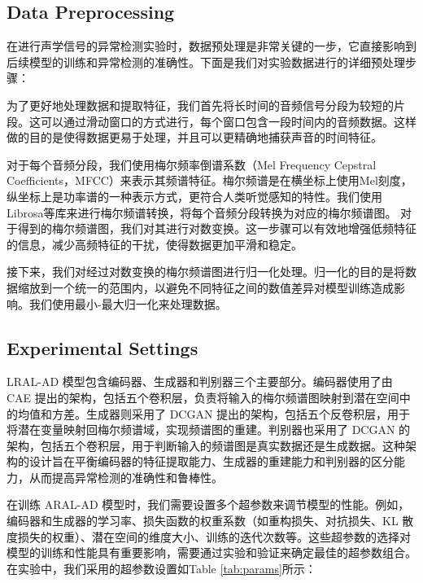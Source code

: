 \documentclass{article}
\begin{document}
\subsection{Data Preprocessing}

在进行声学信号的异常检测实验时，数据预处理是非常关键的一步，它直接影响到后续模型的训练和异常检测的准确性。下面是我们对实验数据进行的详细预处理步骤：


为了更好地处理数据和提取特征，我们首先将长时间的音频信号分段为较短的片段。这可以通过滑动窗口的方式进行，每个窗口包含一段时间内的音频数据。这样做的目的是使得数据更易于处理，并且可以更精确地捕获声音的时间特征。


对于每个音频分段，我们使用梅尔频率倒谱系数（Mel Frequency Cepstral Coefficients，MFCC）来表示其频谱特征。梅尔频谱是在横坐标上使用Mel刻度，纵坐标上是功率谱的一种表示方式，更符合人类听觉感知的特性。我们使用Librosa等库来进行梅尔频谱转换，将每个音频分段转换为对应的梅尔频谱图。 对于得到的梅尔频谱图，我们对其进行对数变换。这一步骤可以有效地增强低频特征的信息，减少高频特征的干扰，使得数据更加平滑和稳定。

接下来，我们对经过对数变换的梅尔频谱图进行归一化处理。归一化的目的是将数据缩放到一个统一的范围内，以避免不同特征之间的数值差异对模型训练造成影响。我们使用最小-最大归一化来处理数据。

\subsection{Experimental Settings}

LRAL-AD 模型包含编码器、生成器和判别器三个主要部分。编码器使用了由 CAE 提出的架构，包括五个卷积层，负责将输入的梅尔频谱图映射到潜在空间中的均值和方差。生成器则采用了 DCGAN 提出的架构，包括五个反卷积层，用于将潜在变量映射回梅尔频谱域，实现频谱图的重建。判别器也采用了 DCGAN 的架构，包括五个卷积层，用于判断输入的频谱图是真实数据还是生成数据。这种架构的设计旨在平衡编码器的特征提取能力、生成器的重建能力和判别器的区分能力，从而提高异常检测的准确性和鲁棒性。

在训练 ARAL-AD 模型时，我们需要设置多个超参数来调节模型的性能。例如，编码器和生成器的学习率、损失函数的权重系数（如重构损失、对抗损失、KL 散度损失的权重）、潜在空间的维度大小、训练的迭代次数等。这些超参数的选择对模型的训练和性能具有重要影响，需要通过实验和验证来确定最佳的超参数组合。在实验中，我们采用的超参数设置如Table \ref{tab:params}所示：
\end{document}
